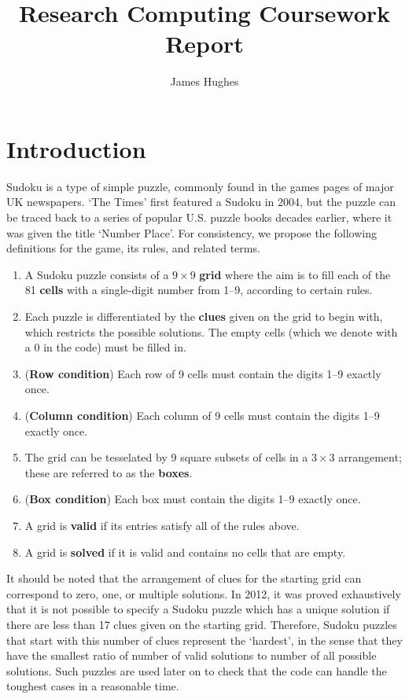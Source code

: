 \documentclass[12pt]{article}
\title{Research Computing Coursework Report}
\author{James Hughes}
\begin{document}
\maketitle
\newpage

\tableofcontents
\section{Introduction}

Sudoku is a type of simple puzzle, commonly found in the games pages of major UK newspapers.
`The Times' first featured a Sudoku in 2004, but the puzzle can be traced back to a series of popular U.S. puzzle books decades earlier, where it was given the title `Number Place'\cite{sudoku}.
For consistency, we propose the following definitions for the game, its rules, and related terms.

\begin{enumerate}
    \item A Sudoku puzzle consists of a $9\times9$ \textbf{grid} where the aim is to fill each of the 81 \textbf{cells} with a single-digit number from 1--9, according to certain rules.
    \item Each puzzle is differentiated by the \textbf{clues} given on the grid to begin with, which restricts the possible solutions. The empty cells (which we denote with a $0$ in the code) must be filled in.
    \item (\textbf{Row condition}) Each row of 9 cells must contain the digits 1--9 exactly once.
    \item (\textbf{Column condition}) Each column of 9 cells must contain the digits 1--9 exactly once.
    \item The grid can be tesselated by 9 square subsets of cells in a $3\times3$ arrangement; these are referred to as the \textbf{boxes}.
    \item (\textbf{Box condition}) Each box must contain the digits 1--9 exactly once.
    \item A grid is \textbf{valid} if its entries satisfy all of the rules above.
    \item A grid is \textbf{solved} if it is valid and contains no cells that are empty.
\end{enumerate}

It should be noted that the arrangement of clues for the starting grid can correspond to zero, one, or multiple solutions.
In 2012, it was proved exhaustively that it is not possible to specify a Sudoku puzzle which has a unique solution if there are less than 17 clues given on the starting grid\cite{17min}.
Therefore, Sudoku puzzles that start with this number of clues represent the `hardest', in the sense that they have the smallest ratio of number of valid solutions to number of all possible solutions.
Such puzzles are used later on to check that the code can handle the toughest cases in a reasonable time.
\end{document}
